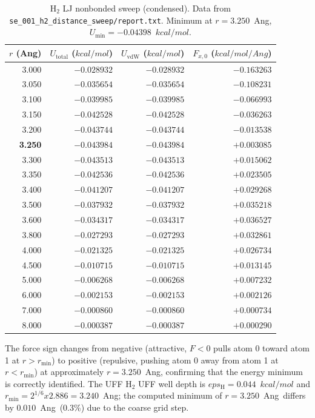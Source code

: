 \documentclass[11pt,twoside]{article}
\def\AA{Ang}%
\def\times{x}%
\def\varepsilon{eps}%
\def\kcalmol{kcal/mol}%
\def\Angstrom{Ang}%
\newcommand{\Angstrom}{\text{\AA}}
\newcommand{\kcalmol}{\text{kcal/mol}}
\begin{document}
\begin{table}[H]
\centering
\caption{H$_2$ LJ nonbonded sweep (condensed). Data from \texttt{se\_001\_h2\_distance\_sweep/report.txt}. Minimum at $r = 3.250$~\AA, $U_{\min} = -0.04398$~$\kcalmol$.}
\label{tab:h2-sweep}
\begin{tabular}{rrrr}
\toprule
$r$ (\AA) & $U_{\mathrm{total}}$ ($\kcalmol$) & $U_{\mathrm{vdW}}$ ($\kcalmol$) & $F_{x,0}$ ($\kcalmol/\Angstrom$) \\
\midrule
3.000 & $-0.028932$ & $-0.028932$ & $-0.163263$ \\
3.050 & $-0.035654$ & $-0.035654$ & $-0.108231$ \\
3.100 & $-0.039985$ & $-0.039985$ & $-0.066993$ \\
3.150 & $-0.042528$ & $-0.042528$ & $-0.036263$ \\
3.200 & $-0.043744$ & $-0.043744$ & $-0.013538$ \\
\textbf{3.250} & $\mathbf{-0.043984}$ & $\mathbf{-0.043984}$ & $\mathbf{+0.003085}$ \\
3.300 & $-0.043513$ & $-0.043513$ & $+0.015062$ \\
3.350 & $-0.042536$ & $-0.042536$ & $+0.023505$ \\
3.400 & $-0.041207$ & $-0.041207$ & $+0.029268$ \\
3.500 & $-0.037932$ & $-0.037932$ & $+0.035218$ \\
3.600 & $-0.034317$ & $-0.034317$ & $+0.036527$ \\
3.800 & $-0.027293$ & $-0.027293$ & $+0.032861$ \\
4.000 & $-0.021325$ & $-0.021325$ & $+0.026734$ \\
4.500 & $-0.010715$ & $-0.010715$ & $+0.013145$ \\
5.000 & $-0.006268$ & $-0.006268$ & $+0.007232$ \\
6.000 & $-0.002153$ & $-0.002153$ & $+0.002126$ \\
7.000 & $-0.000860$ & $-0.000860$ & $+0.000734$ \\
8.000 & $-0.000387$ & $-0.000387$ & $+0.000290$ \\
\bottomrule
\end{tabular}
\end{table}

The force sign changes from negative (attractive, $F < 0$ pulls atom 0 toward atom 1 at $r > r_{\min}$) to positive (repulsive, pushing atom 0 away from atom 1 at $r < r_{\min}$) at approximately $r = 3.250$~\AA, confirming that the energy minimum is correctly identified. The UFF H$_2$ UFF well depth is $\varepsilon_{\mathrm{H}} = 0.044$~$\kcalmol$ and $r_{\min} = 2^{1/6} \times 2.886 = 3.240$~\AA; the computed minimum of $r = 3.250$~\AA\ differs by $0.010$~\AA\ (0.3\%) due to the coarse grid step.
\end{document}
